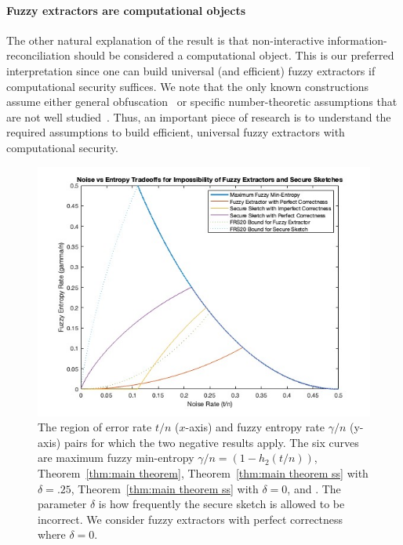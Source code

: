 \paragraph{Fuzzy extractors are computational objects} The other natural explanation of the result is that non-interactive information-reconciliation should be considered a computational object. This is our preferred interpretation since one can build universal (and efficient) fuzzy extractors if computational security suffices.  We note that the only known constructions assume either general obfuscation~\cite{BarakBCKPS13,BitanskyCKP14,bitansky2017virtual} or specific number-theoretic assumptions that are not well studied~\cite{galbraith2019obfuscated}. Thus, an important piece of research is to understand the required assumptions to build efficient, universal fuzzy extractors with computational security. 

\begin{figure}[t]
\centering
\includegraphics[width=.9\textwidth]{EntropyvsError.jpg}
\caption{The region of error rate $t/n$ ($x$-axis) and fuzzy entropy rate $\gamma/n$ (y-axis) pairs for which the two negative results apply.  The six curves are maximum fuzzy min-entropy $\gamma/n = (1-h_2(t/n))$, Theorem~\ref{thm:main theorem}, Theorem~\ref{thm:main theorem ss} with $\delta=.25$,  Theorem~\ref{thm:main theorem ss} with $\delta =0$, \cite[Theorem 5.1]{fuller2020fuzzy} and \cite[Theorem 7.2]{fuller2020fuzzy}. The parameter $\delta$ is how frequently the secure sketch is allowed to be incorrect.  We consider fuzzy extractors with perfect correctness where $\delta=0$.}
\label{fig:param regime}
\end{figure}

